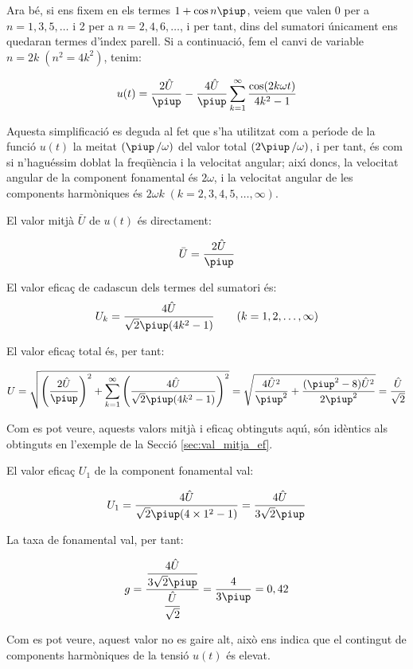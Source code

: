 \begin{exemple}
    Ara b\'{e}, si ens fixem en els termes $1+\cos n \piup$, veiem que valen 0
    per a $n=1,3,5,\ldots$ i 2 per a $n=2,4,6,\ldots$, i per tant, dins
    del sumatori \'{u}nicament ens quedaran termes d'\'{\i}ndex parell. Si a
    continuaci\'{o}, fem el canvi de variable $n=2k\;(n^2=4k^2)$, tenim:

    \[
    u(t) = \frac{2\hat{U}}{\piup} - \frac{4\hat{U}}{\piup} \sum_{k=1}^\infty
          \frac{\cos(2 k \omega t)}{4k^2-1}
    \]

    Aquesta simplificaci\'{o} es deguda al fet que s'ha utilitzat com a
    per\'{\i}ode de la funci\'{o} $u(t)$ la meitat $(\piup\,/\omega)$ del valor total
    $(2\piup\,/\omega)$, i per tant, \'{e}s com si n'hagu\'{e}ssim doblat la
    freq\"{u}\`{e}ncia i la velocitat angular; aix\'{\i} doncs, la velocitat angular
    de la component fonamental \'{e}s $2\omega$, i la velocitat angular de
    les components harm\`{o}niques \'{e}s $2\omega k \;(k=2,3,4,5,\ldots,\infty)$.

    El valor mitj\`{a} $\bar{U}$ de $u(t)$ \'{e}s directament:

    \[
        \bar{U} = \frac{2\hat{U}}{\piup}
    \]

    El valor efica\c{c} de cadascun dels termes del sumatori \'{e}s:
    \[
        U_k =\frac{4\hat{U}}{\sqrt{2}\piup(4k^2-1)}
        \qquad(k=1,2,\ldots,\infty)
    \]

    El valor efica\c{c} total \'{e}s, per tant:

    \[
        U=\sqrt{\left(\frac{2\hat{U}}{\piup}\right)^2 + \sum_{k=1}^\infty
        \left(\frac{4\hat{U}}{\sqrt{2}\piup(4k^2-1)}\right)^2} =
        \sqrt{\frac{4\hat{U}^2}{\piup^2} + \frac{(\piup^2-8)\hat{U}^2}{2\piup^2}
        }= \frac{\hat{U}}{\sqrt{2}}
    \]

    Com es pot veure, aquests valors mitj\`{a} i efica\c{c} obtinguts aqu\'{\i}, s\'{o}n
    id\`{e}ntics als obtinguts en l'exemple de la Secci\'{o}
    \ref{sec:val_mitja_ef}.

    El valor efica\c{c} $U_1$ de la component fonamental val:

    \[
        U_1 =\frac{4\hat{U}}{\sqrt{2}\piup(4\times 1^2-1)} =
        \frac{4\hat{U}}{3\sqrt{2}\piup}
    \]

    La taxa de fonamental val, per tant:

    \[
        g =
        \frac{\dfrac{4\hat{U}}{3\sqrt{2}\piup}}{\dfrac{\hat{U}}{\sqrt{2}}}
        =\frac{4}{3\piup} = 0,{42}
    \]

    Com es pot veure, aquest valor no es gaire alt, aix\`{o} ens indica que
    el contingut de components harm\`{o}niques de la tensi\'{o} $u(t)$ \'{e}s
    elevat.
\end{exemple}


